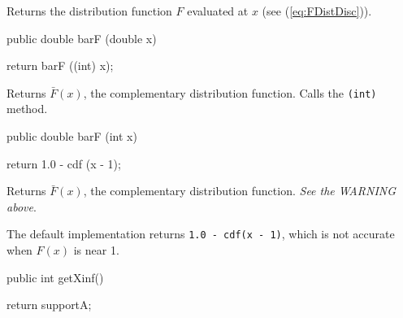 \begin{tabb}  Returns the distribution function $F$ evaluated at $x$
(see (\ref{eq:FDistDisc})).
\end{tabb}
\begin{htmlonly}
\end{htmlonly}
\begin{code}

   public double barF (double x)\begin{hide} {
      return barF ((int) x);
   }\end{hide}
\end{code}
\begin{tabb}   Returns $\bar F(x)$, the complementary distribution function.
  Calls the \texttt{(int)} method.
\end{tabb}
\begin{htmlonly}
\end{htmlonly}
\begin{code}

   public double barF (int x)\begin{hide} {
      return 1.0 - cdf (x - 1);
   }\end{hide}
\end{code}
\begin{tabb}  Returns $\bar F(x)$, the complementary
   distribution function. \emph{See the WARNING above}.
\begin{detailed}%
   The default implementation returns \texttt{1.0 - cdf(x - 1)}, which
   is not accurate when $F(x)$ is near 1.
\end{detailed}%
\end{tabb}
\begin{htmlonly}
\end{htmlonly}
\begin{code}

   public int getXinf()\begin{hide} {
      return supportA;
   }\end{hide}
\end{code}

